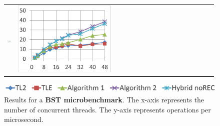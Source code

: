\begin{figure}
\begin{tabular}{m{0.05\linewidth}m{0.47\linewidth}m{0.47\linewidth}}
        \vspace{-5mm}\includegraphics[width=\linewidth]{figures/graphs/20i20d100000k-nrq0.png} &
        \vspace{-5mm}\includegraphics[width=\linewidth]{figures/graphs/20i20d100000k-nrq1.png}
        \\
    \end{tabular}
    \vspace{-2mm}
	\includegraphics[width=\linewidth]{figures/graphs/dsbench_legend.png}
    \vspace{-5mm}
\caption{Results for a \textbf{BST microbenchmark}.
The x-axis represents the number of concurrent threads.
The y-axis represents operations per microsecond.}
\label{fig-exp-bst}
\end{figure}

